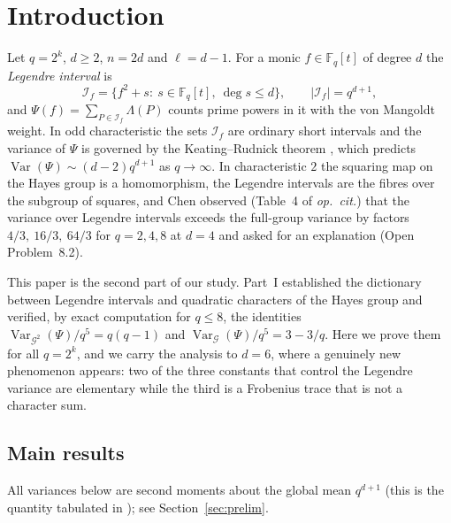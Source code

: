 \documentclass[11pt,a4paper]{amsart}
\theoremstyle{definition}
\newcommand{\F}{\mathbb{F}}
\newcommand{\G}{\mathcal{G}}
\newcommand{\Var}{\operatorname{Var}}
\begin{document}
\maketitle
\tableofcontents

\section{Introduction}

Let $q=2^k$, $d\ge2$, $n=2d$ and $\ell=d-1$. For a monic $f\in\F_q[t]$ of degree $d$ the \emph{Legendre interval} is
\[
\mathcal I_f=\{f^2+s:\ s\in\F_q[t],\ \deg s\le d\},\qquad |\mathcal I_f|=q^{d+1},
\]
and $\Psi(f)=\sum_{P\in\mathcal I_f}\Lambda(P)$ counts prime powers in it with the von Mangoldt weight. In odd characteristic the sets $\mathcal I_f$ are ordinary short intervals and the variance of $\Psi$ is governed by the Keating--Rudnick theorem \cite{KR}, which predicts $\Var(\Psi)\sim(d-2)q^{d+1}$ as $q\to\infty$. In characteristic $2$ the squaring map on the Hayes group is a homomorphism, the Legendre intervals are the fibres over the subgroup of squares, and Chen \cite{Chen} observed (Table~4 of \emph{op.\ cit.}) that the variance over Legendre intervals exceeds the full-group variance by factors $4/3,\ 16/3,\ 64/3$ for $q=2,4,8$ at $d=4$ and asked for an explanation (Open Problem~8.2).

This paper is the second part of our study. Part~I established the dictionary between Legendre intervals and quadratic characters of the Hayes group and verified, by exact computation for $q\le8$, the identities $\Var_{\G^2}(\Psi)/q^5=q(q-1)$ and $\Var_{\G}(\Psi)/q^5=3-3/q$. Here we prove them for all $q=2^k$, and we carry the analysis to $d=6$, where a genuinely new phenomenon appears: two of the three constants that control the Legendre variance are elementary while the third is a Frobenius trace that is not a character sum.

\subsection*{Main results}
All variances below are second moments about the global mean $q^{d+1}$ (this is the quantity tabulated in \cite{Chen}); see Section~\ref{sec:prelim}.
\end{document}
